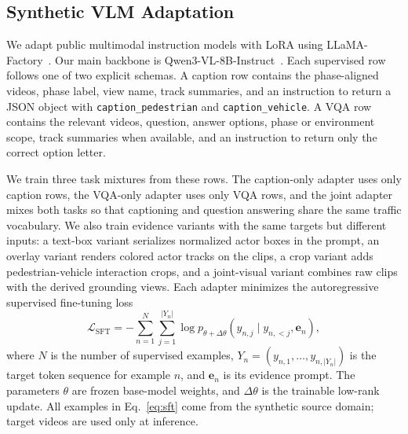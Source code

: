 \documentclass[runningheads]{llncs}
\begin{document}
\subsection{Synthetic VLM Adaptation}

We adapt public multimodal instruction models with LoRA using LLaMA-Factory~\cite{llamafactory}. Our main backbone is Qwen3-VL-8B-Instruct~\cite{qwen3vl}. Each supervised row follows one of two explicit schemas. A caption row contains the phase-aligned videos, phase label, view name, track summaries, and an instruction to return a JSON object with \texttt{caption\_pedestrian} and \texttt{caption\_vehicle}. A VQA row contains the relevant videos, question, answer options, phase or environment scope, track summaries when available, and an instruction to return only the correct option letter.

We train three task mixtures from these rows. The caption-only adapter uses only caption rows, the VQA-only adapter uses only VQA rows, and the joint adapter mixes both tasks so that captioning and question answering share the same traffic vocabulary. We also train evidence variants with the same targets but different inputs: a text-box variant serializes normalized actor boxes in the prompt, an overlay variant renders colored actor tracks on the clips, a crop variant adds pedestrian-vehicle interaction crops, and a joint-visual variant combines raw clips with the derived grounding views. Each adapter minimizes the autoregressive supervised fine-tuning loss
\begin{equation}
    \mathcal{L}_{\mathrm{SFT}}
    =
    -\sum_{n=1}^{N}
    \sum_{j=1}^{|Y_n|}
    \log p_{\theta+\Delta\theta}
    \left(y_{n,j}\mid y_{n,<j},\mathbf{e}_n\right),
    \label{eq:sft}
\end{equation}
where $N$ is the number of supervised examples, $Y_n=(y_{n,1},\ldots,y_{n,|Y_n|})$ is the target token sequence for example $n$, and $\mathbf{e}_n$ is its evidence prompt. The parameters $\theta$ are frozen base-model weights, and $\Delta\theta$ is the trainable low-rank update. All examples in Eq.~\ref{eq:sft} come from the synthetic source domain; target videos are used only at inference.

\end{document}
